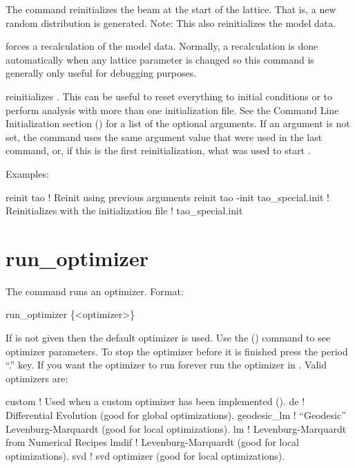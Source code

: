 \vskip 10pt 

The  command reinitializes the beam at the start of the
lattice. That is, a new random distribution is generated.  Note: This also reinitializes
the model data.

 forces a recalculation of the model data.  Normally, a
recalculation is done automatically when any lattice parameter is changed so this command
is generally only useful for debugging purposes.

 reinitializes \tao. This can be useful to reset everything to initial
conditions or to perform analysis with more than one initialization file. See the Command Line
Initialization section () for a list of the optional arguments. If an argument
is not set, the  command uses the same argument value that were used in the last
 command, or, if this is the first reinitialization, what was used to start \tao.

Examples:
\begin{example}
  reinit tao                         ! Reinit using previous arguments
  reinit tao -init tao_special.init  ! Reinitializes \tao with the initialization file 
                                     !   tao_special.init
\end{example}


\section{run_optimizer}
\label{s:run}

The  command runs an optimizer. Format:
\begin{example}
  run_optimizer \{<optimizer>\}
\end{example}

\vskip 10pt 

If  is not given then the default optimizer is used.  Use the 
() command to see optimizer parameters.  To stop the optimizer before it is
finished press the period ``.''  key. If you want the optimizer to run forever run the optimizer in
. Valid optimizers are:
\begin{example}
  custom        ! Used when a custom optimizer has been implemented ().
  de            ! Differential Evolution (good for global optimizations).
  geodesic_lm   ! ``Geodesic'' Levenburg-Marquardt (good for local optimizations).
  lm            ! Levenburg-Marquardt from Numerical Recipes 
  lmdif         ! Levenburg-Marquardt (good for local optimizations).
  svd           ! svd optimizer (good for local optimizations).
\end{example}

